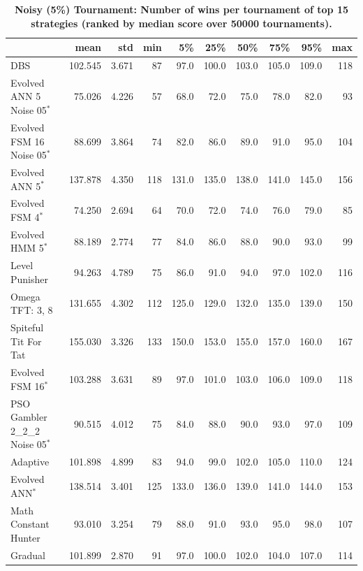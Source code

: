 \documentclass[10pt,letterpaper]{article}
\begin{document}
\begin{table}[!hbtp]
    \centering
        \caption{\bf Noisy (5\%) Tournament: Number of wins per tournament
        of top 15 strategies (ranked by median score over
        50000 tournaments).}
        \footnotesize
\begin{tabular}{lrrrrrrrrr}
\toprule
{} &     mean &    std &  min &     5\% &    25\% &    50\% &    75\% &    95\% &  max \\
\midrule
DBS                              &  102.545 &  3.671 &   87 &   97.0 &  100.0 &  103.0 &  105.0 &  109.0 &  118 \\
Evolved ANN 5 Noise 05$^{*}$     &   75.026 &  4.226 &   57 &   68.0 &   72.0 &   75.0 &   78.0 &   82.0 &   93 \\
Evolved FSM 16 Noise 05$^{*}$    &   88.699 &  3.864 &   74 &   82.0 &   86.0 &   89.0 &   91.0 &   95.0 &  104 \\
Evolved ANN 5$^{*}$              &  137.878 &  4.350 &  118 &  131.0 &  135.0 &  138.0 &  141.0 &  145.0 &  156 \\
Evolved FSM 4$^{*}$              &   74.250 &  2.694 &   64 &   70.0 &   72.0 &   74.0 &   76.0 &   79.0 &   85 \\
Evolved HMM 5$^{*}$              &   88.189 &  2.774 &   77 &   84.0 &   86.0 &   88.0 &   90.0 &   93.0 &   99 \\
Level Punisher                   &   94.263 &  4.789 &   75 &   86.0 &   91.0 &   94.0 &   97.0 &  102.0 &  116 \\
Omega TFT: 3, 8                  &  131.655 &  4.302 &  112 &  125.0 &  129.0 &  132.0 &  135.0 &  139.0 &  150 \\
Spiteful Tit For Tat             &  155.030 &  3.326 &  133 &  150.0 &  153.0 &  155.0 &  157.0 &  160.0 &  167 \\
Evolved FSM 16$^{*}$             &  103.288 &  3.631 &   89 &   97.0 &  101.0 &  103.0 &  106.0 &  109.0 &  118 \\
PSO Gambler 2\_2\_2 Noise 05$^{*}$ &   90.515 &  4.012 &   75 &   84.0 &   88.0 &   90.0 &   93.0 &   97.0 &  109 \\
Adaptive                         &  101.898 &  4.899 &   83 &   94.0 &   99.0 &  102.0 &  105.0 &  110.0 &  124 \\
Evolved ANN$^{*}$                &  138.514 &  3.401 &  125 &  133.0 &  136.0 &  139.0 &  141.0 &  144.0 &  153 \\
Math Constant Hunter             &   93.010 &  3.254 &   79 &   88.0 &   91.0 &   93.0 &   95.0 &   98.0 &  107 \\
Gradual                          &  101.899 &  2.870 &   91 &   97.0 &  100.0 &  102.0 &  104.0 &  107.0 &  114 \\
\bottomrule
\end{tabular}
        \label{tbl:noisy_wins}
\end{table}
\end{document}
